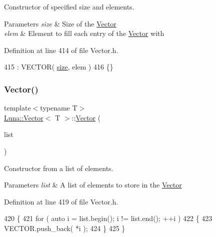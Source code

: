 Constructor of specified size and elements. 


\begin{DoxyParams}{Parameters}
{\em size} & Size of the \hyperlink{classLuna_1_1Vector}{Vector} \\
\hline
{\em elem} & Element to fill each entry of the \hyperlink{classLuna_1_1Vector}{Vector} with \\
\hline
\end{DoxyParams}


Definition at line 414 of file Vector.\+h.


\begin{DoxyCode}
415                                             : VECTOR( \hyperlink{classLuna_1_1Vector_ac9b6ed7a0df401728f27c193fbc8f4d8}{size}, elem )
416   \{\}
\end{DoxyCode}
\mbox{\label{classLuna_1_1Vector_acb8301bdca059a3880eb3478f52fca2d}} 
\subsubsection{\texorpdfstring{Vector()}{Vector()}\hspace{0.1cm}{\footnotesize\ttfamily [4/5]}}
{\footnotesize\ttfamily template$<$typename T$>$ \\
\hyperlink{classLuna_1_1Vector}{Luna\+::\+Vector}$<$ T $>$\+::\hyperlink{classLuna_1_1Vector}{Vector} (\begin{DoxyParamCaption}\item[{const std\+::initializer\+\_\+list$<$ T $>$ \&}]{list }\end{DoxyParamCaption})\hspace{0.3cm}{\ttfamily [inline]}}



Constructor from a list of elements. 


\begin{DoxyParams}{Parameters}
{\em list} & A list of elements to store in the \hyperlink{classLuna_1_1Vector}{Vector} \\
\hline
\end{DoxyParams}


Definition at line 419 of file Vector.\+h.


\begin{DoxyCode}
420   \{
421     \textcolor{keywordflow}{for} ( \textcolor{keyword}{auto} i = list.begin(); i != list.end(); ++i )
422     \{
423       VECTOR.push\_back( *i );
424     \}
425   \}
\end{DoxyCode}
\mbox{\label{classLuna_1_1Vector_aa6a0a3ba8b22ee42e3ffd5087950644d}} 
